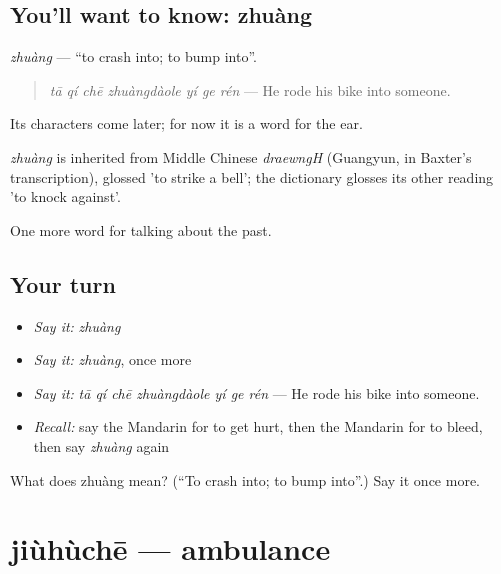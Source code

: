 \subsection*{You'll want to know: zhuàng}
\emph{zhuàng} — \textquotedblleft{}to crash into; to bump into\textquotedblright{}.

\begin{quote}
\emph{tā qí chē zhuàngdàole yí ge rén} — He rode his bike into someone.
\end{quote}

Its characters come later; for now it is a word for the ear.

\begin{cousinweb}
\emph{zhuàng} is inherited from Middle Chinese \emph{draewngH} (Guangyun, in Baxter's transcription), glossed 'to strike a bell'; the dictionary glosses its other reading 'to knock against'.
\end{cousinweb}

\begin{grammarlens}[title={What you've built}]
One more word for talking about the past.
\end{grammarlens}

\subsection*{Your turn}
\begin{itemize}
\raggedright
  \item \emph{Say it:} \emph{zhuàng}
  \item \emph{Say it:} \emph{zhuàng}, once more
  \item \emph{Say it:} \emph{tā qí chē zhuàngdàole yí ge rén} — He rode his bike into someone.
  \item \emph{Recall:} say the Mandarin for to get hurt, then the Mandarin for to bleed, then say \emph{zhuàng} again
\end{itemize}

\begin{tcolorbox}[breakable,colback=teal!4,colframe=teal!35!black,title={Before you move on}]
What does zhuàng mean? (\textquotedblleft{}To crash into; to bump into\textquotedblright{}.) Say it once more.
\end{tcolorbox}
\section[jiùhùchē]{jiùhùchē — ambulance}

\label{lesson:ZH-C232-jiuhuche}



